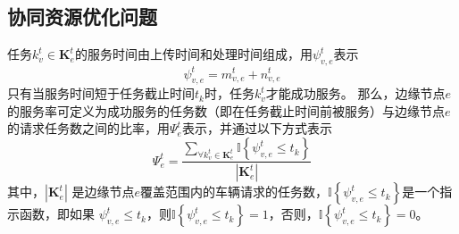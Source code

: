 \subsection{协同资源优化问题}

任务$k_v^t \in \mathbf{K}_{e}^{t}$的服务时间由上传时间和处理时间组成，用$\psi_{v, e}^{t}$表示
\begin{equation}
	\psi_{v, e}^{t} = m_{v, e}^{t} +  n_{v, e}^{t}
	\label{equ 4-10}
\end{equation}
只有当服务时间短于任务截止时间$t_k$时，任务$k_v^t$才能成功服务。
那么，边缘节点$e$的服务率可定义为成功服务的任务数（即在任务截止时间前被服务）与边缘节点$e$的请求任务数之间的比率，用$\Psi_{e}^{t}$表示，并通过以下方式表示
\begin{equation}
	\Psi_{e}^{t} = \frac{\sum_{\forall k_{v}^{t} \in \mathbf{K}_{e}^{t}} \mathbb{I} \left\{ \psi_{v, e}^{t} \leq t_{k} \right\} }{|\mathbf{K}_{e}^{t}|}
	\label{equ 4-11}
\end{equation}
\noindent 其中，$|\mathbf{K}_{e}^{t}|$ 是边缘节点$e$覆盖范围内的车辆请求的任务数，$\mathbb{I} \left\{ \psi_{v, e}^{t} \leq t_{k} \right\}$是一个指示函数，即如果 $\psi_{v, e}^{t} \leq t_{k}$，则$\mathbb{I} \left\{ \psi_{v, e}^{t} \leq t_{k} \right\} =1$，否则，$\mathbb{I} \left\{ \psi_{v, e}^{t} \leq t_{k} \right\} =0$。

